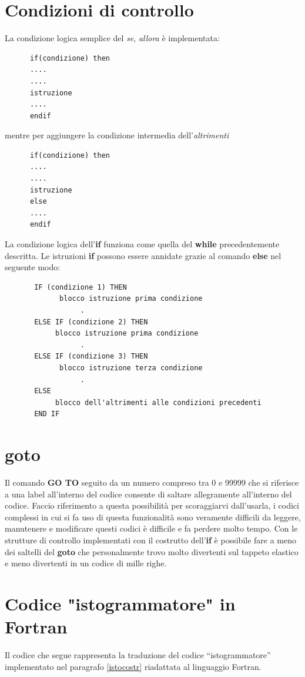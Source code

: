 \documentclass[11pt,fleqn]{book} %
\begin{document}
\section{Condizioni di controllo}

La condizione logica semplice del \textit{se}, \textit{allora} è implementata:

\begin{verbatim}
      if(condizione) then
      ....
      ....
      istruzione
      ....
      endif 
\end{verbatim}
mentre per aggiungere la condizione intermedia dell'\textit{altrimenti}

\begin{verbatim}
      if(condizione) then
      ....
      ....
      istruzione
      else 
      ....
      endif 
\end{verbatim}

La condizione logica dell'\textbf{if} funziona come quella del \textbf{while} precedentemente descritta.
Le istruzioni \textbf{if} possono essere annidate grazie al comando \textbf{else} nel seguente modo:
\begin{verbatim}
       IF (condizione 1) THEN
             blocco istruzione prima condizione
                  .
       ELSE IF (condizione 2) THEN
            blocco istruzione prima condizione
                  .
       ELSE IF (condizione 3) THEN
             blocco istruzione terza condizione
                  .
       ELSE
            blocco dell'altrimenti alle condizioni precedenti
       END IF
\end{verbatim}


\section{goto}
Il comando \textbf{GO TO} seguito da un numero compreso tra 0 e 99999 che si riferisce a una label all'interno del codice consente di saltare allegramente all'interno del codice. Faccio riferimento a questa possibilità per scoraggiarvi dall'usarla, i codici complessi in cui si fa uso di questa funzionalità sono veramente difficili da leggere, manutenere e modificare questi codici è difficile e fa perdere molto tempo. Con le strutture di controllo implementati con il  costrutto dell'\textbf{if} è possibile fare a meno dei saltelli del \textbf{goto} che personalmente trovo molto divertenti sul tappeto elastico e meno divertenti in un codice di mille righe.


\section{Codice "istogrammatore" in Fortran}
Il codice che segue rappresenta la traduzione del codice ``istogrammatore'' implementato nel paragrafo \ref{istocostr} riadattata al linguaggio Fortran.
\end{document}
